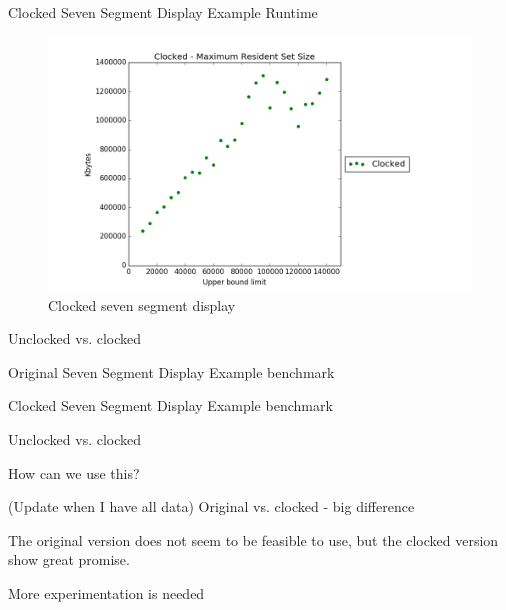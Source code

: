 \documentclass[11pt]{beamer}
\begin{document}
\begin{frame}{Clocked Seven Segment Display Example Runtime}
          \begin{figure}[!ht]
               \centering
               \includegraphics[scale=0.4]{figures/clocked_size.png}
               \caption{Clocked seven segment display}
          \end{figure}
\end{frame}

\begin{frame}{Unclocked vs. clocked}
\end{frame}

\begin{frame}{Original Seven Segment Display Example benchmark}
\end{frame}

\begin{frame}{Clocked Seven Segment Display Example benchmark}
\end{frame}

\begin{frame}{Unclocked vs. clocked}
\end{frame}
%
\begin{frame}{How can we use this?}

\begin{block}{}
(Update when I have all data)
Original vs. clocked - big difference
\end{block}

\pause

\begin{block}{}
The original version does not seem to be feasible to use, but the clocked version show great promise.
\end{block}

\pause

\begin{block}{}
More experimentation is needed
\end{block}

\end{frame}
\end{document}
